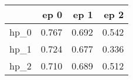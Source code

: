\begin{tabular}{lrrr}
\toprule
{} &   ep 0 &   ep 1 &   ep 2 \\
\midrule
hp\_0 &  0.767 &  0.692 &  0.542 \\
hp\_1 &  0.724 &  0.677 &  0.336 \\
hp\_2 &  0.710 &  0.689 &  0.512 \\
\bottomrule
\end{tabular}
